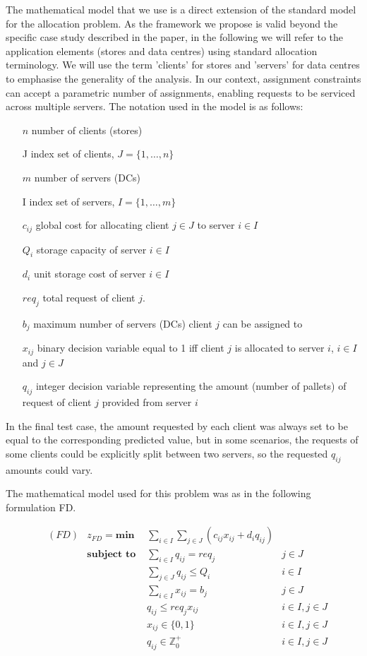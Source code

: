 \documentclass[opre,sglanonrev,11pt]{informs4}
\begin{document}
The mathematical model that we use is a direct extension of the standard model for the allocation problem. As the framework we propose is valid beyond the specific case study described in the paper, in the following we will refer to the application elements (stores and data centres) using standard allocation terminology. We will use the term 'clients' for stores and 'servers' for data centres to emphasise the generality of the analysis. In our context, assignment constraints can accept a parametric number of assignments, enabling requests to be serviced across multiple servers. The notation used in the model is as follows:

\begin{enumerate}
	\item[$n$] number of clients (stores)
	\item[J] index set of clients, $J=\{1, \ldots, n\}$
	\item[$m$] number of servers (DCs)
	\item[I] index set of servers, $I=\{1, \ldots, m\}$
	\item[$c_{ij}$] global cost for allocating client $j \in J$ to server $i \in I$
	\item[$Q_i$] storage capacity of server $i \in I$
	\item[$d_i$] unit storage cost of server $i \in I$
	\item[$req_j$] total request of client $j$.
	\item[$b_j$] maximum number of servers (DCs) client $j$ can be assigned to
	\item[$x_{ij}$] binary decision variable equal to 1 iff client $j$ is allocated to server $i$, $i \in I$ and $j \in J$
	\item[$q_{ij}$] integer decision variable representing the amount (number of pallets) of request of client $j$ provided from server $i$
\end{enumerate}

In the final test case, the amount requested by each client was always set to be equal to the corresponding predicted value, but in some scenarios, the requests of some clients could be explicitly split between two servers, so the requested $q_{ij}$ amounts could vary.

The mathematical model used for this problem was as in the following formulation FD.

\begin{align}
	&(FD) & z_{FD} = \textbf{min } & \sum_{i \in I} \sum_{j \in J} ( c_{ij}x_{ij} + d_i q_{ij} ) \label{ALLobj}\\
	& &  \textbf{subject to }
	& \sum_{i \in I} q_{ij} = req_j & j \in J  \label{ALLrequest}\\
	& &  & \sum_{j \in J}q_{ij} \leq Q_i & i \in I \label{ALLcapacity}\\
	& &  & \sum_{i \in I} x_{ij} = b_j & j \in J  \label{ALLnumserv}\\
	& &  & q_{ij} \leq req_j x_{ij} & i \in I, j \in J \label{ALLcontin}\\
	& &  & x_{ij} \in \{0,1\} & i\in I, j \in J \label{ALLx}\\
	& &  & q_{ij} \in \mathbb{Z}^+_0 & i\in I, j \in J \label{ALLq}
\end{align}
\end{document}
